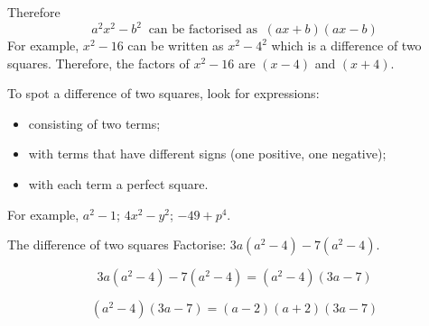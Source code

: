 Therefore
\begin{equation*}
{a}^{2}{x}^{2}-{b}^{2}~\mbox{ can be factorised as }~(ax+b)(ax-b)
\end{equation*}
For example, ${x}^{2}-16$ can be written as ${x}^{2}-{4}^{2}$ which is a difference of two squares. Therefore, the factors of ${x}^{2}-16$ are $(x-4)$ and $(x+4)$.

\par
To spot a difference of two squares, look for expressions:
\begin{itemize}
\item consisting of two terms;
\item with terms that have different signs (one positive, one negative);
\item with each term a perfect square.
\end{itemize}
For example, $a^{2}-1$; $4x^{2}-y^{2}$; $-49+p^{4}$.




\begin{wex}{The difference of two squares}
{Factorise: $3a(a^2-4)-7(a^2-4)$.}
{


\begin{equation*}
  3a(a^2-4)-7(a^2-4) = (a^2-4)(3a-7)
\end{equation*}

$$
(a^2-4)(3a-7) = (a-2)(a+2)(3a-7)
$$
}
\end{wex}


